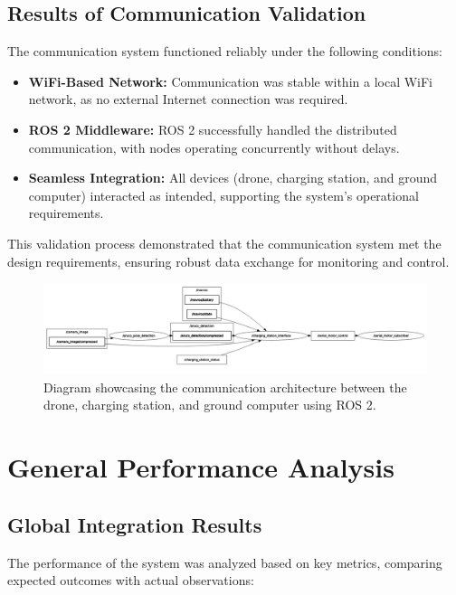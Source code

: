 \subsection{Results of Communication Validation}

The communication system functioned reliably under the following conditions:
\begin{itemize}
    \item \textbf{WiFi-Based Network:} Communication was stable within a local WiFi network, as no external Internet connection was required.
    \item \textbf{ROS 2 Middleware:} ROS 2 successfully handled the distributed communication, with nodes operating concurrently without delays.
    \item \textbf{Seamless Integration:} All devices (drone, charging station, and ground computer) interacted as intended, supporting the system's operational requirements.
\end{itemize}

This validation process demonstrated that the communication system met the design requirements, ensuring robust data exchange for monitoring and control.

\begin{figure}[H]
    \centering
    \includegraphics[width=1\textwidth]{pictures/complete_node_diagram.png}
    \caption{Diagram showcasing the communication architecture between the drone, charging station, and ground computer using ROS 2.}
    \label{fig:communication_validation}
\end{figure}

\section{General Performance Analysis}

\subsection{Global Integration Results}

The performance of the system was analyzed based on key metrics, comparing expected outcomes with actual observations:

